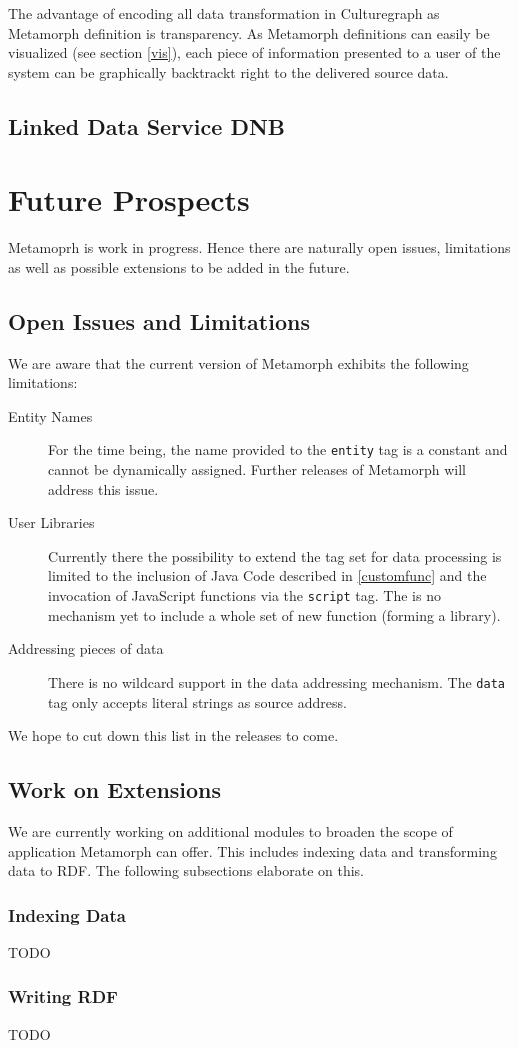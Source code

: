 \documentclass[12pt,a4paper]{article}
\begin{document}
The advantage of encoding all data transformation in Culturegraph as Metamorph definition is transparency. As Metamorph definitions can easily be visualized (see section \ref{vis}), each piece of information presented to a user of the system can be graphically backtrackt right to the delivered source data.


\subsection{Linked Data Service DNB}



\section{Future Prospects}
Metamoprh is work in progress. Hence there are naturally open issues, limitations as well as possible extensions to be added in the future. 

\subsection{Open Issues and Limitations}

We are aware that the current version of Metamorph exhibits the following limitations:

\begin{description}
\item[Entity Names]  For the time being, the name provided to the {\tt entity} tag is a constant and cannot be dynamically assigned. Further releases of Metamorph will address this issue.
\item[User Libraries] Currently there the possibility to extend the tag set for data processing is limited to the inclusion of Java Code described in \ref{customfunc} and the invocation of JavaScript functions via the {\tt script} tag. The is no mechanism yet to include a whole set of new function (forming a library).
\item[Addressing pieces of data] There is no wildcard support in the data addressing mechanism. The {\tt data} tag only accepts literal strings as source address.
\end{description}
We hope to cut down this list in the releases to come.

\subsection{Work on Extensions}
We are currently working on additional modules to broaden the scope of application Metamorph can offer.
This includes indexing data and transforming data to RDF. The following subsections elaborate on this.

\subsubsection{Indexing Data}
TODO

\subsubsection{Writing RDF}
TODO
\end{document}
